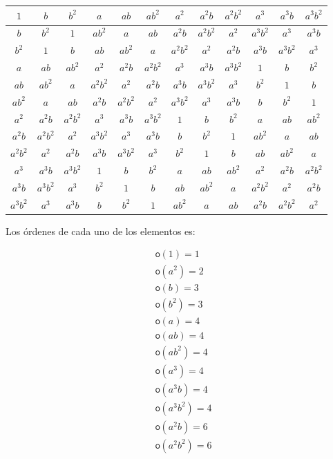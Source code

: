 \documentclass[12pt,a4paper,fleqn,spanish,final,openright]{extbook}
\theoremstyle{definition}
\theoremstyle{remark}
\begin{document}
\begin{flushleft}
\begin{tabular}{|c|c|c|c|c|c|c|c|c|c|c|c|}
\hline
 $1$ & $b$ & $b^2$ & $a$ & $ab$ & $ab^2$ & $a^2$ & $a^2b$ & $a^2b^2$ & $a^3$ & $a^3b$ & $a^3b^2$ \\
\hline
 $b$ & $b^2$ & $1$ & $ab^2$ & $a$ & $ab$ & $a^2b$ & $a^2b^2$ & $a^2$ & $a^3b^2$ & $a^3$ & $a^3b$ \\
\hline
 $b^2$ & $1$ & $b$ & $ab$ & $ab^2$ & $a$ & $a^2b^2$ & $a^2$ & $a^2b$ & $a^3b$ & $a^3b^2$ & $a^3$ \\
\hline
 $a$ & $ab$ & $ab^2$ & $a^2$ & $a^2b$ & $a^2b^2$ & $a^3$ & $a^3b$ & $a^3b^2$ & $1$ & $b$ & $b^2$ \\
\hline
 $ab$ & $ab^2$ & $a$ & $a^2b^2$ & $a^2$ & $a^2b$ & $a^3b$ & $a^3b^2$ & $a^3$ & $b^2$ & $1$ & $b$ \\
\hline
 $ab^2$ & $a$ & $ab$ & $a^2b$ & $a^2b^2$ & $a^2$ & $a^3b^2$ & $a^3$ & $a^3b$ & $b$ & $b^2$ & $1$ \\
\hline
 $a^2$ & $a^2b$ & $a^2b^2$ & $a^3$ & $a^3b$ & $a^3b^2$ & $1$ & $b$ & $b^2$ & $a$ & $ab$ & $ab^2$ \\
\hline
 $a^2b$ & $a^2b^2$ & $a^2$ & $a^3b^2$ & $a^3$ & $a^3b$ & $b$ & $b^2$ & $1$ & $ab^2$ & $a$ & $ab$ \\
\hline
 $a^2b^2$ & $a^2$ & $a^2b$ & $a^3b$ & $a^3b^2$ & $a^3$ & $b^2$ & $1$ & $b$ & $ab$ & $ab^2$ & $a$ \\
\hline
 $a^3$ & $a^3b$ & $a^3b^2$ & $1$ & $b$ & $b^2$ & $a$ & $ab$ & $ab^2$ & $a^2$ & $a^2b$ & $a^2b^2$ \\
\hline
 $a^3b$ & $a^3b^2$ & $a^3$ & $b^2$ & $1$ & $b$ & $ab$ & $ab^2$ & $a$ & $a^2b^2$ & $a^2$ & $a^2b$ \\
\hline
 $a^3b^2$ & $a^3$ & $a^3b$ & $b$ & $b^2$ & $1$ & $ab^2$ & $a$ & $ab$ & $a^2b$ & $a^2b^2$ & $a^2$ \\
\hline
\end{tabular} 
\end{flushleft}

Los órdenes de cada uno de los elementos es:

\begin{align*}
&\mathsf{o}\left(1\right)=1\\
&\mathsf{o}\left(a^2\right)=2\\
&\mathsf{o}\left(b\right)=3\\
&\mathsf{o}\left(b^2\right)=3\\
&\mathsf{o}\left(a\right)=4\\
&\mathsf{o}\left(ab\right)=4\\
&\mathsf{o}\left(ab^2\right)=4\\
&\mathsf{o}\left(a^3\right)=4\\
&\mathsf{o}\left(a^3b\right)=4\\
&\mathsf{o}\left(a^3b^2\right)=4\\
&\mathsf{o}\left(a^2b\right)=6\\
&\mathsf{o}\left(a^2b^2\right)=6
\end{align*}
\end{document}
